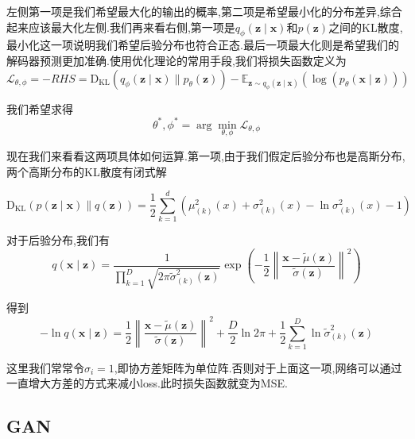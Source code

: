 	左侧第一项是我们希望最大化的输出的概率,第二项是希望最小化的分布差异,综合起来应该最大化左侧.我们再来看右侧,第一项是$q_{\phi}(\bm{z} \mid \bm{x})$和$p(\bm z)$之间的KL散度,最小化这一项说明我们希望后验分布也符合正态.最后一项最大化则是希望我们的解码器预测更加准确.使用优化理论的常用手段,我们将损失函数定义为
	\begin{equation}
		\mathcal{L}_{\theta, \phi} = -RHS = \operatorname{D_{KL}}\left(q_{\phi}(\bm{z} \mid \bm{x}) \| p_{\theta}(\bm{z})\right)-\mathbb E_{\bm{z} \sim q_{\phi}(\bm{z} \mid \bm{x})}\left(\log \left(p_{\theta}(\bm{x} \mid \bm{z})\right)\right)
	\end{equation}

	我们希望求得
	\begin{equation}
		\theta^{*}, \phi^{*} = \arg\min_{\theta, \phi} \mathcal{L}_{\theta, \phi}
	\end{equation}

	现在我们来看看这两项具体如何运算.第一项,由于我们假定后验分布也是高斯分布,两个高斯分布的KL散度有闭式解
	
	\begin{equation}
		\operatorname{D_{KL}}(p(\bm z \mid \bm x) \| q(\bm z))=\frac{1}{2} \sum_{k=1}^{d}\left(\mu_{(k)}^{2}(x)+\sigma_{(k)}^{2}(x)-\ln \sigma_{(k)}^{2}(x)-1\right)
	\end{equation}
	
	对于后验分布,我们有
	\begin{equation}
		q(\bm x \mid \bm z)=\frac{1}{\prod_{k=1}^{D} \sqrt{2 \pi \tilde{\sigma}_{(k)}^{2}(\bm z)}} \exp \left(-\frac{1}{2}\left\|\frac{\bm x-\tilde{\mu}(\bm z)}{\tilde{\sigma}(\bm z)}\right\|^{2}\right)
	\end{equation}

	得到
	\begin{equation}
		-\ln q(\bm x \mid \bm z)=\frac{1}{2}\left\|\frac{\bm x-\tilde{\mu}(\bm z)}{\tilde{\sigma}(\bm z)}\right\|^{2}+\frac{D}{2} \ln 2 \pi+\frac{1}{2} \sum_{k=1}^{D} \ln \tilde{\sigma}_{(k)}^{2}(\bm z)
	\end{equation}

	这里我们常常令$\sigma_i = 1$,即协方差矩阵为单位阵.否则对于上面这一项,网络可以通过一直增大方差的方式来减小loss.此时损失函数就变为MSE.
	
	\subsection{GAN}
	
